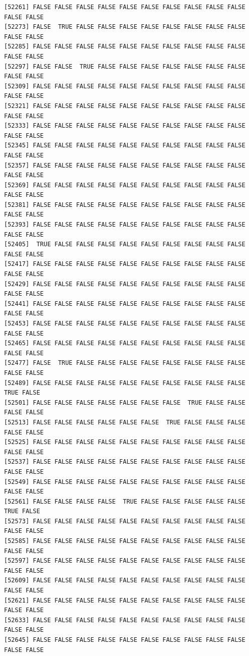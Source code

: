 \documentclass[
  a4paper,
  DIV=11,
  numbers=noendperiod]{scrartcl}
\begin{document}
\begin{verbatim}
[52261] FALSE FALSE FALSE FALSE FALSE FALSE FALSE FALSE FALSE FALSE FALSE FALSE
[52273] FALSE  TRUE FALSE FALSE FALSE FALSE FALSE FALSE FALSE FALSE FALSE FALSE
[52285] FALSE FALSE FALSE FALSE FALSE FALSE FALSE FALSE FALSE FALSE FALSE FALSE
[52297] FALSE FALSE  TRUE FALSE FALSE FALSE FALSE FALSE FALSE FALSE FALSE FALSE
[52309] FALSE FALSE FALSE FALSE FALSE FALSE FALSE FALSE FALSE FALSE FALSE FALSE
[52321] FALSE FALSE FALSE FALSE FALSE FALSE FALSE FALSE FALSE FALSE FALSE FALSE
[52333] FALSE FALSE FALSE FALSE FALSE FALSE FALSE FALSE FALSE FALSE FALSE FALSE
[52345] FALSE FALSE FALSE FALSE FALSE FALSE FALSE FALSE FALSE FALSE FALSE FALSE
[52357] FALSE FALSE FALSE FALSE FALSE FALSE FALSE FALSE FALSE FALSE FALSE FALSE
[52369] FALSE FALSE FALSE FALSE FALSE FALSE FALSE FALSE FALSE FALSE FALSE FALSE
[52381] FALSE FALSE FALSE FALSE FALSE FALSE FALSE FALSE FALSE FALSE FALSE FALSE
[52393] FALSE FALSE FALSE FALSE FALSE FALSE FALSE FALSE FALSE FALSE FALSE FALSE
[52405]  TRUE FALSE FALSE FALSE FALSE FALSE FALSE FALSE FALSE FALSE FALSE FALSE
[52417] FALSE FALSE FALSE FALSE FALSE FALSE FALSE FALSE FALSE FALSE FALSE FALSE
[52429] FALSE FALSE FALSE FALSE FALSE FALSE FALSE FALSE FALSE FALSE FALSE FALSE
[52441] FALSE FALSE FALSE FALSE FALSE FALSE FALSE FALSE FALSE FALSE FALSE FALSE
[52453] FALSE FALSE FALSE FALSE FALSE FALSE FALSE FALSE FALSE FALSE FALSE FALSE
[52465] FALSE FALSE FALSE FALSE FALSE FALSE FALSE FALSE FALSE FALSE FALSE FALSE
[52477] FALSE  TRUE FALSE FALSE FALSE FALSE FALSE FALSE FALSE FALSE FALSE FALSE
[52489] FALSE FALSE FALSE FALSE FALSE FALSE FALSE FALSE FALSE FALSE  TRUE FALSE
[52501] FALSE FALSE FALSE FALSE FALSE FALSE FALSE  TRUE FALSE FALSE FALSE FALSE
[52513] FALSE FALSE FALSE FALSE FALSE FALSE  TRUE FALSE FALSE FALSE FALSE FALSE
[52525] FALSE FALSE FALSE FALSE FALSE FALSE FALSE FALSE FALSE FALSE FALSE FALSE
[52537] FALSE FALSE FALSE FALSE FALSE FALSE FALSE FALSE FALSE FALSE FALSE FALSE
[52549] FALSE FALSE FALSE FALSE FALSE FALSE FALSE FALSE FALSE FALSE FALSE FALSE
[52561] FALSE FALSE FALSE FALSE  TRUE FALSE FALSE FALSE FALSE FALSE  TRUE FALSE
[52573] FALSE FALSE FALSE FALSE FALSE FALSE FALSE FALSE FALSE FALSE FALSE FALSE
[52585] FALSE FALSE FALSE FALSE FALSE FALSE FALSE FALSE FALSE FALSE FALSE FALSE
[52597] FALSE FALSE FALSE FALSE FALSE FALSE FALSE FALSE FALSE FALSE FALSE FALSE
[52609] FALSE FALSE FALSE FALSE FALSE FALSE FALSE FALSE FALSE FALSE FALSE FALSE
[52621] FALSE FALSE FALSE FALSE FALSE FALSE FALSE FALSE FALSE FALSE FALSE FALSE
[52633] FALSE FALSE FALSE FALSE FALSE FALSE FALSE FALSE FALSE FALSE FALSE FALSE
[52645] FALSE FALSE FALSE FALSE FALSE FALSE FALSE FALSE FALSE FALSE FALSE FALSE

\end{verbatim}
\end{document}
